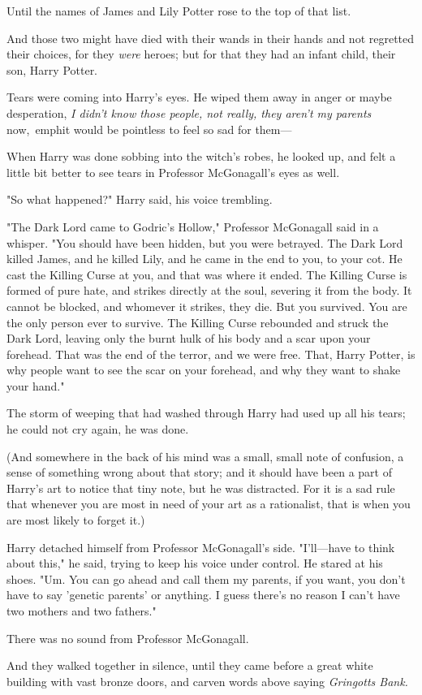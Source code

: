 Until the names of James and Lily Potter rose to the top of that list.

And those two might have died with their wands in their hands and not regretted 
their choices, for they \emph{were} heroes; but for that they had an infant 
child, their son, Harry Potter.

Tears were coming into Harry's eyes. He wiped them away in anger or maybe 
desperation, \emph{I didn't know those people, not really, they aren't my 
parents} now,\ emph{it would be pointless to feel so sad for them---}

When Harry was done sobbing into the witch's robes, he looked up, and felt a 
little bit better to see tears in Professor McGonagall's eyes as well.

"So what happened?" Harry said, his voice trembling.

"The Dark Lord came to Godric's Hollow," Professor McGonagall said in a 
whisper. "You should have been hidden, but you were betrayed. The Dark Lord 
killed James, and he killed Lily, and he came in the end to you, to your cot. 
He cast the Killing Curse at you, and that was where it ended. The Killing 
Curse is formed of pure hate, and strikes directly at the soul, severing it 
from the body. It cannot be blocked, and whomever it strikes, they die. But you 
survived. You are the only person ever to survive. The Killing Curse rebounded 
and struck the Dark Lord, leaving only the burnt hulk of his body and a scar 
upon your forehead. That was the end of the terror, and we were free. That, 
Harry Potter, is why people want to see the scar on your forehead, and why they 
want to shake your hand."

The storm of weeping that had washed through Harry had used up all his tears; 
he could not cry again, he was done.

(And somewhere in the back of his mind was a small, small note of confusion, a 
sense of something wrong about that story; and it should have been a part of 
Harry's art to notice that tiny note, but he was distracted. For it is a sad 
rule that whenever you are most in need of your art as a rationalist, that is 
when you are most likely to forget it.)

Harry detached himself from Professor McGonagall's side. "I'll---have to think 
about this," he said, trying to keep his voice under control. He stared at his 
shoes. "Um. You can go ahead and call them my parents, if you want, you don't 
have to say 'genetic parents' or anything. I guess there's no reason I can't 
have two mothers and two fathers."

There was no sound from Professor McGonagall.

And they walked together in silence, until they came before a great white 
building with vast bronze doors, and carven words above saying \emph{Gringotts 
Bank.}

